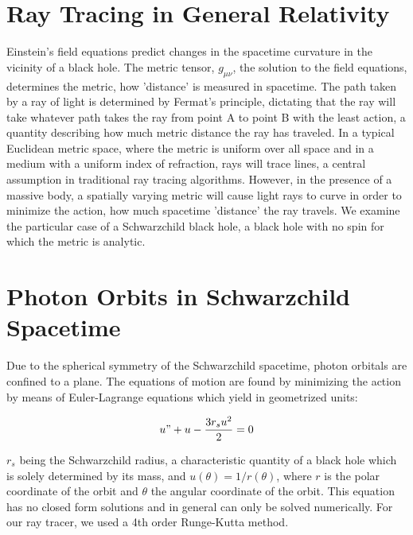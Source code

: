 \documentclass[sigconf]{acmart}
\begin{document}
%
\maketitle

\section{Ray Tracing in General Relativity}

Einstein's field equations predict changes in the spacetime curvature in the vicinity of a black hole. The metric tensor, $g_{\mu\nu}$, the solution to the field equations, determines the metric, how 'distance' is measured in spacetime. The path taken by a ray of light is determined by Fermat's principle, dictating that the ray will take whatever path takes the ray from point A to point B with the least action, a quantity describing how much metric distance the ray has traveled. In a typical Euclidean metric space, where the metric is uniform over all space and in a medium with a uniform index of refraction, rays will trace lines, a central assumption in traditional ray tracing algorithms. However, in the presence of a massive body, a spatially varying metric will cause light rays to curve in order to minimize the action, how much spacetime 'distance' the ray travels.  We examine the particular case of a Schwarzchild black hole, a black hole with no spin for which the metric is analytic.

\section{Photon Orbits in Schwarzchild Spacetime}

Due to the spherical symmetry of the Schwarzchild spacetime, photon orbitals are confined to a plane.  The equations of motion are found by minimizing the action by means of Euler-Lagrange equations which yield in geometrized units\cite{drakos_moore}:

\begin{displaymath}
  u" + u - \frac{3r_su^2}{2} = 0
\end{displaymath}

$r_s$ being the Schwarzchild radius, a characteristic quantity of a black hole which is solely determined by its mass, and $u(\theta) = 1/r(\theta)$, where $r$ is the polar coordinate of the orbit and $\theta$ the angular coordinate of the orbit.  This equation has no closed form solutions and in general can only be solved numerically.  For our ray tracer, we used a 4th order Runge-Kutta method\cite{colostate}.
\end{document}
